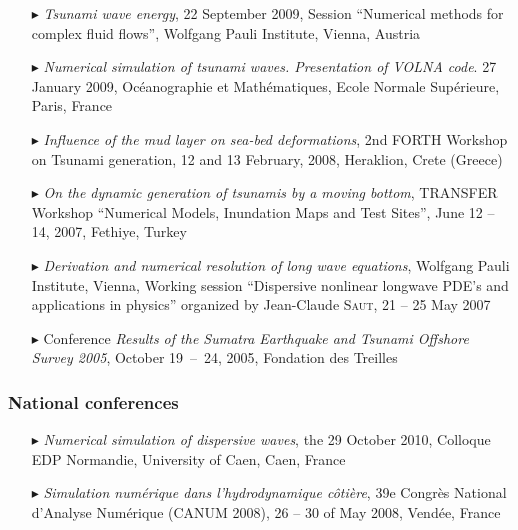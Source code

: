 \begin{itemize}
  \item[$\blacktriangleright$] \textit{Tsunami wave energy}, 22 September 2009, Session ``Numerical methods for complex fluid flows'', Wolfgang Pauli Institute, Vienna, Austria
  
  \item[$\blacktriangleright$] \textit{Numerical simulation of tsunami waves. Presentation of VOLNA code}. 27 January 2009, Oc\'eanographie et Math\'ematiques, Ecole Normale Sup\'erieure, Paris, France
  
  \item[$\blacktriangleright$] \textit{Influence of the mud layer on sea-bed deformations}, 2nd FORTH Workshop on Tsunami generation, 12 and 13 February, 2008, Heraklion, Crete (Greece)
  
  \item[$\blacktriangleright$] \textit{On the dynamic generation of tsunamis by a moving bottom}, TRANSFER Workshop ``Numerical Models, Inundation Maps and Test Sites'', June 12 -- 14, 2007, Fethiye, Turkey
  
  \item[$\blacktriangleright$] \textit{Derivation and numerical resolution of long wave equations}, Wolfgang Pauli Institute, Vienna, Working session ``Dispersive nonlinear longwave PDE's and applications in physics'' organized by Jean-Claude \textsc{Saut}, 21 -- 25 May 2007

  \item[$\blacktriangleright$] Conference \og \textit{Results of the Sumatra Earthquake and Tsunami Offshore Survey 2005}\fg{}, October 19~--~24, 2005, Fondation des Treilles
\end{itemize}

\separator
\subsubsection{National conferences}

\begin{itemize}

  \item[$\blacktriangleright$] \textit{Numerical simulation of dispersive waves}, the 29 October 2010, Colloque EDP Normandie, University of Caen, Caen, France
  
  \item[$\blacktriangleright$] \textit{Simulation num\'erique dans l'hydrodynamique c\^oti\`ere}, 39e Congr\`es National d'Analyse Num\'erique (CANUM 2008), 26 -- 30 of May 2008, Vend\'ee, France
  
\end{itemize}

